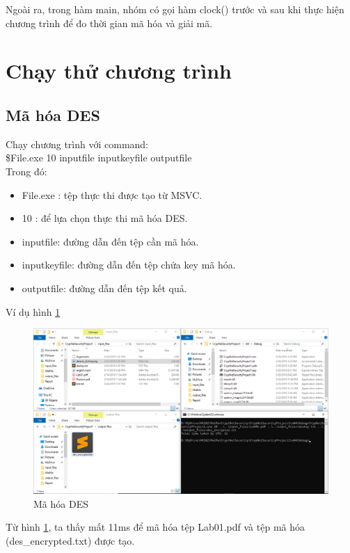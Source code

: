\documentclass[a4paper]{article}
\begin{document}
	Ngoài ra, trong hàm main, nhóm có gọi hàm clock() trước và sau khi thực hiện chương trình để đo thời gian mã hóa và giải mã.

\section{Chạy thử chương trình}
	\subsection{Mã hóa DES}
    Chạy chương trình với command:\\
    \$File.exe 10 inputfile inputkeyfile outputfile\\
    Trong đó:
    \begin{itemize}
        \item File.exe : tệp thực thi được tạo từ MSVC.
        \item 10 : để lựa chọn thực thi mã hóa DES.
        \item inputfile: đường dẫn đến tệp cần mã hóa.
        \item inputkeyfile: đường dẫn đến tệp chứa key mã hóa.
        \item outputfile: đường dẫn đến tệp kết quả. 
    \end{itemize}
    
    Ví dụ hình \ref{fig:desen}
    \begin{figure}[htp]
        \centering
        \includegraphics[scale=0.4]{desen.png}
        \caption{Mã hóa DES}
        \label{fig:desen}
    \end{figure}
	
	Từ hình \ref{fig:desen}, ta thấy mất 11ms để mã hóa tệp Lab01.pdf và tệp mã hóa (des\_encrypted.txt) được tạo.
\end{document}
